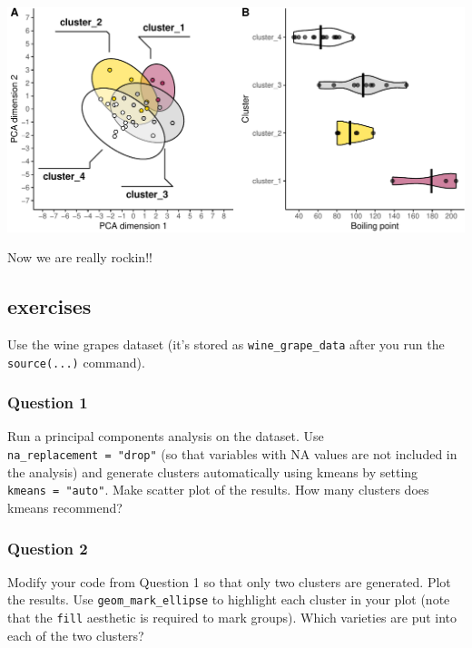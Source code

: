 \documentclass[
]{krantz}
\begin{document}
\begin{center}\includegraphics[width=1\linewidth]{index_files/figure-latex/unnamed-chunk-112-1} \end{center}

Now we are really rockin!!

\hypertarget{exercises-5}{%
\subsection{exercises}\label{exercises-5}}

Use the wine grapes dataset (it's stored as \texttt{wine\_grape\_data} after you run the \texttt{source(...)} command).

\hypertarget{question-1}{%
\subsubsection{Question 1}\label{question-1}}

Run a principal components analysis on the dataset. Use \texttt{na\_replacement\ =\ "drop"} (so that variables with NA values are not included in the analysis) and generate clusters automatically using kmeans by setting \texttt{kmeans\ =\ "auto"}. Make scatter plot of the results. How many clusters does kmeans recommend?

\hypertarget{question-2}{%
\subsubsection{Question 2}\label{question-2}}

Modify your code from Question 1 so that only two clusters are generated. Plot the results. Use \texttt{geom\_mark\_ellipse} to highlight each cluster in your plot (note that the \texttt{fill} aesthetic is required to mark groups). Which varieties are put into each of the two clusters?
\end{document}
